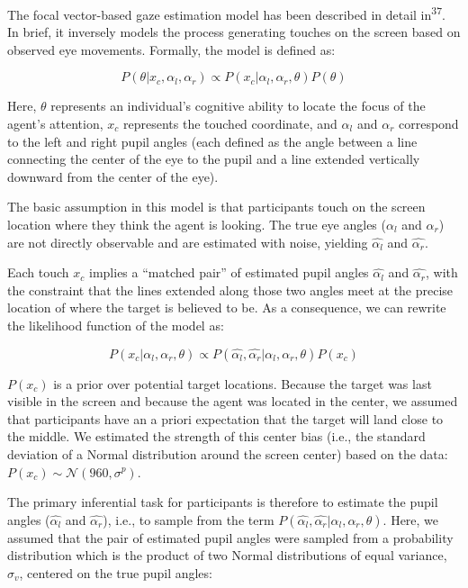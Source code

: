 \documentclass[
  man,floatsintext]{apa6}
\begin{document}
The focal vector-based gaze estimation model has been described in detail in\textsuperscript{37}. In brief, it inversely models the process generating touches on the screen based on observed eye movements. Formally, the model is defined as:

\begin{equation}
    P(\theta | x_c, \alpha_l, \alpha_r) \propto P(x_c | \alpha_l, \alpha_r, \theta)P(\theta)
\end{equation}

Here, \(\theta\) represents an individual's cognitive ability to locate the focus of the agent's attention, \(x_c\) represents the touched coordinate, and \(\alpha_l\) and \(\alpha_r\) correspond to the left and right pupil angles (each defined as the angle between a line connecting the center of the eye to the pupil and a line extended vertically downward from the center of the eye).

The basic assumption in this model is that participants touch on the screen location where they think the agent is looking. The true eye angles (\(\alpha_l\) and \(\alpha_r\)) are not directly observable and are estimated with noise, yielding \(\hat{\alpha_l}\) and \(\hat{\alpha_r}\).

Each touch \(x_c\) implies a ``matched pair'' of estimated pupil angles \(\hat{\alpha_l}\) and \(\hat{\alpha_r}\), with the constraint that the lines extended along those two angles meet at the precise location of where the target is believed to be. As a consequence, we can rewrite the likelihood function of the model as:

\begin{equation}
P(x_c | \alpha_l, \alpha_r, \theta) \propto P(\hat{\alpha_l}, \hat{\alpha_r} | \alpha_l, \alpha_r, \theta) P(x_c)
\end{equation}

\(P(x_c)\) is a prior over potential target locations. Because the target was last visible in the screen and because the agent was located in the center, we assumed that participants have an a priori expectation that the target will land close to the middle. We estimated the strength of this center bias (i.e., the standard deviation of a Normal distribution around the screen center) based on the data: \(P(x_c) \sim \mathcal{N}(960, \sigma^p)\).

The primary inferential task for participants is therefore to estimate the pupil angles (\(\hat{\alpha_l}\) and \(\hat{\alpha_r}\)), i.e., to sample from the term \(P(\hat{\alpha_l}, \hat{\alpha_r} | \alpha_l, \alpha_r, \theta)\). Here, we assumed that the pair of estimated pupil angles were sampled from a probability distribution which is the product of two Normal distributions of equal variance, \(\sigma_v\), centered on the true pupil angles:
\end{document}

